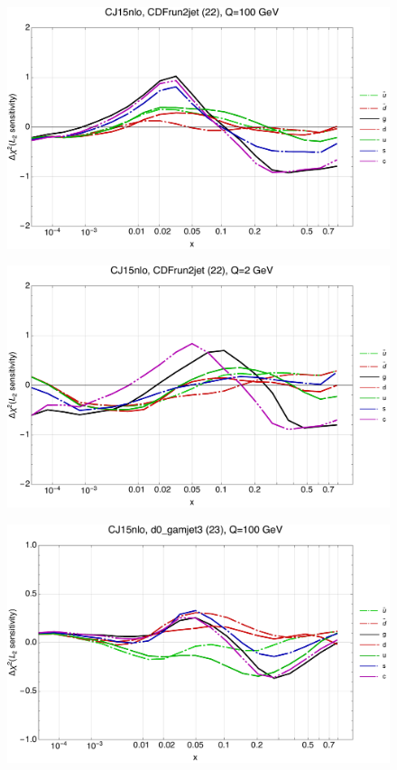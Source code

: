 \documentclass[10pt,aps,prd,floatfix,titlepage]{revtex4}
\begin{document}
\clearpage
\begin{figure}
\includegraphics[width=\textwidth,height=0.44\textheight,keepaspectratio]{1/22_CJ15nlo_L2_q100_Sf_1.pdf}
\caption{}
\end{figure}
\begin{figure}
\includegraphics[width=\textwidth,height=0.44\textheight,keepaspectratio]{1/22_CJ15nlo_L2_q2_Sf_1.pdf}
\caption{}
\end{figure}
\clearpage
\begin{figure}
\includegraphics[width=\textwidth,height=0.44\textheight,keepaspectratio]{1/23_CJ15nlo_L2_q100_Sf_1.pdf}
\caption{}
\end{figure}
\end{document}
